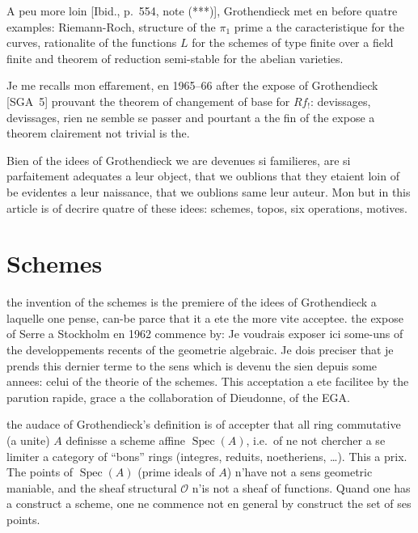 \documentclass[11pt,a4paper]{article}
\theoremstyle{plain}
\theoremstyle{definition}
\DeclareMathOperator{\Spec}{Spec}
\begin{document}
A peu more loin [Ibid., p.~554, note (***)], Grothendieck met en before quatre examples: Riemann-Roch, structure of the $\pi_1$ prime a the caracteristique for the curves, rationalite of the functions $L$ for the schemes of type finite over a field finite and theorem of reduction semi-stable for the abelian varieties.

Je me recalls mon effarement, en 1965--66 after the expose of Grothendieck [SGA~5] prouvant the theorem of changement of base for $Rf_!$: devissages, devissages, rien ne semble se passer and pourtant a the fin of the expose a theorem clairement not trivial is the.

Bien of the idees of Grothendieck we are devenues si familieres, are si parfaitement adequates a leur object, that we oublions that they etaient loin of be evidentes a leur naissance, that we oublions same leur auteur. Mon but in this article is of decrire quatre of these idees: schemes, topos, six operations, motives.

\section{Schemes}

the invention of the schemes is the premiere of the idees of Grothendieck a laquelle one pense, can-be parce that it a ete the more vite acceptee. the expose of Serre a Stockholm en 1962 commence by: \guillemotleft Je voudrais exposer ici some-uns of the developpements recents of the geometrie algebraic. Je dois preciser that je prends this dernier terme to the sens which is devenu the sien depuis some annees: celui of the theorie of the schemes.\guillemotright{} This acceptation a ete facilitee by the parution rapide, grace a the collaboration of Dieudonne, of the EGA.

the audace of Grothendieck's definition is of accepter that all ring commutative (a unite) $A$ definisse a scheme affine $\Spec(A)$, i.e.\ of ne not chercher a se limiter a category of ``bons'' rings (integres, reduits, noetheriens, \ldots). This a prix. The points of $\Spec(A)$ (prime ideals of $A$) n'have not a sens geometric maniable, and the sheaf structural $\mathcal{O}$ n'is not a sheaf of functions. Quand one has a construct a scheme, one ne commence not en general by construct the set of ses points.
\end{document}

